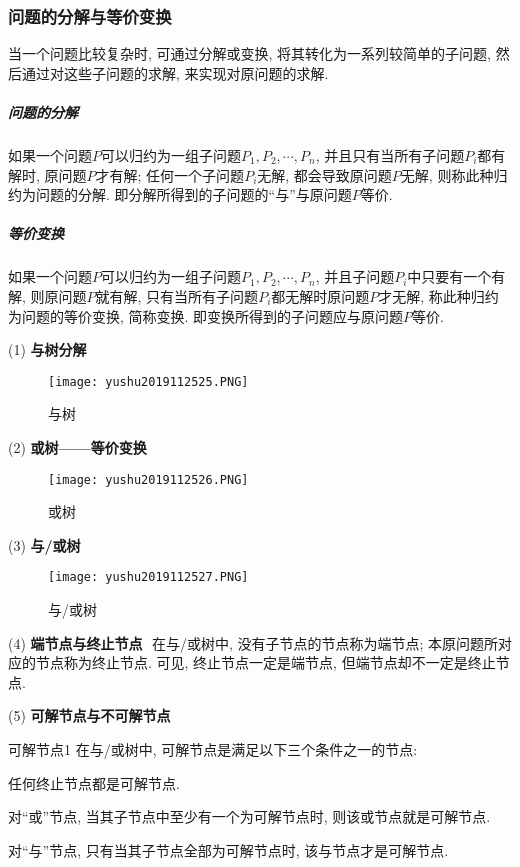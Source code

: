 \subsubsection{问题的分解与等价变换}
当一个问题比较复杂时, 可通过分解或变换, 将其转化为一系列较简单的子问题, 然后通过对这些子问题的求解, 来实现对原问题的求解.
\subparagraph{问题的分解}
如果一个问题$P$可以归约为一组子问题$P_1,P_2,\cdots,P_n$, 并且只有当所有子问题$P_i$都有解时, 原问题$P$才有解; 任何一个子问题$P_i$无解, 都会导致原问题$P$无解, 则称此种归约为问题的分解.
即分解所得到的子问题的“与”与原问题$P$等价.
\subparagraph{等价变换}
如果一个问题$P$可以归约为一组子问题$P_1,P_2,\cdots,P_n$, 并且子问题$P_i$中只要有一个有解, 则原问题$P$就有解, 只有当所有子问题$P_i$都无解时原问题$P$才无解, 称此种归约为问题的等价变换, 简称变换.
即变换所得到的子问题应与原问题$P$等价.

(1) \textbf{与树分解}
\begin{figure}[H]
\centering
\texttt{[image: yushu2019112525.PNG]}
\caption{与树 }
\label{AI32fig25}
\end{figure}

(2) \textbf{或树——等价变换}
\begin{figure}[H]
    \centering
    \texttt{[image: yushu2019112526.PNG]}
    \caption{或树 }
    \label{AI32fig26}
\end{figure}

(3) \textbf{与/或树}
\begin{figure}[H]
    \centering
    \texttt{[image: yushu2019112527.PNG]}
    \caption{与/或树 }
    \label{AI32fig27}
\end{figure}
(4) \textbf{端节点与终止节点}\,\, 在与/或树中, 没有子节点的节点称为端节点; 本原问题所对应的节点称为终止节点. 可见, 终止节点一定是端节点, 但端节点却不一定是终止节点.

(5) \textbf{可解节点与不可解节点}
\begin{mydef}{可解节点}{1}
在与/或树中, 可解节点是满足以下三个条件之一的节点:

 任何终止节点都是可解节点.

 对“或”节点, 当其子节点中至少有一个为可解节点时, 则该或节点就是可解节点.

 对“与”节点, 只有当其子节点全部为可解节点时, 该与节点才是可解节点.
\end{mydef}

